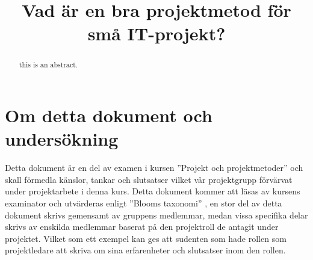 \documentclass[conference]{IEEEtran}
\begin{document}
%
\title{Vad är en bra projektmetod för små IT-projekt?}


\author
    {
    }

\maketitle

\begin{abstract}
  this is an abstract.
\end{abstract}

\IEEEpeerreviewmaketitle

\section{Om detta dokument och undersökning}
Detta dokument är en del av examen i kursen ''Projekt och projektmetoder'' och skall förmedla känslor, tankar och slutsatser vilket vår projektgrupp förvärvat under  projektarbete i denna kurs. Detta dokument kommer att läsas av kursens examinator och utvärderas enligt ''Blooms taxonomi''
, en stor del av detta dokument skrivs gemensamt av gruppens medlemmar, medan vissa specifika delar skrivs av enskilda medlemmar baserat på den projektroll de antagit under projektet. Vilket som ett exempel kan ges att sudenten som hade rollen som projektledare att skriva om sina erfarenheter och slutsatser inom den rollen.
\end{document}
